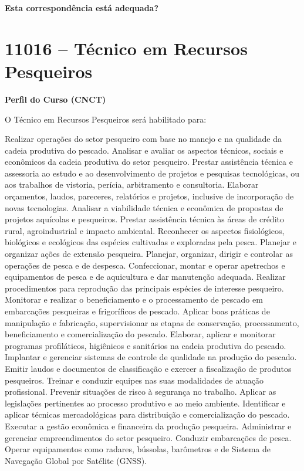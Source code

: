 \documentclass[
]{article}
\begin{document}
\begin{Form}
\textbf{Esta correspondência está adequada?} \\ 
\end{Form}

\newpage
\section{ 11016 -- Técnico em Recursos Pesqueiros }

\textbf{Perfil do Curso (CNCT)}

O Técnico em Recursos Pesqueiros será habilitado para:

Realizar operações do setor pesqueiro com base no manejo e na qualidade
da cadeia produtiva do pescado. Analisar e avaliar os aspectos técnicos,
sociais e econômicos da cadeia produtiva do setor pesqueiro. Prestar
assistência técnica e assessoria ao estudo e ao desenvolvimento de
projetos e pesquisas tecnológicas, ou aos trabalhos de vistoria,
perícia, arbitramento e consultoria. Elaborar orçamentos, laudos,
pareceres, relatórios e projetos, inclusive de incorporação de novas
tecnologias. Analisar a viabilidade técnica e econômica de propostas de
projetos aquícolas e pesqueiros. Prestar assistência técnica às áreas de
crédito rural, agroindustrial e impacto ambiental. Reconhecer os
aspectos fisiológicos, biológicos e ecológicos das espécies cultivadas e
exploradas pela pesca. Planejar e organizar ações de extensão pesqueira.
Planejar, organizar, dirigir e controlar as operações de pesca e de
despesca. Confeccionar, montar e operar apetrechos e equipamentos de
pesca e de aquicultura e dar manutenção adequada. Realizar procedimentos
para reprodução das principais espécies de interesse pesqueiro.
Monitorar e realizar o beneficiamento e o processamento de pescado em
embarcações pesqueiras e frigoríficos de pescado. Aplicar boas práticas
de manipulação e fabricação, supervisionar as etapas de conservação,
processamento, beneficiamento e comercialização do pescado. Elaborar,
aplicar e monitorar programas profiláticos, higiênicos e sanitários na
cadeia produtiva do pescado. Implantar e gerenciar sistemas de controle
de qualidade na produção do pescado. Emitir laudos e documentos de
classificação e exercer a fiscalização de produtos pesqueiros. Treinar e
conduzir equipes nas suas modalidades de atuação profissional. Prevenir
situações de risco à segurança no trabalho. Aplicar as legislações
pertinentes ao processo produtivo e ao meio ambiente. Identificar e
aplicar técnicas mercadológicas para distribuição e comercialização do
pescado. Executar a gestão econômica e financeira da produção pesqueira.
Administrar e gerenciar empreendimentos do setor pesqueiro. Conduzir
embarcações de pesca. Operar equipamentos como radares, bússolas,
barômetros e de Sistema de Navegação Global por Satélite (GNSS).
\end{document}
